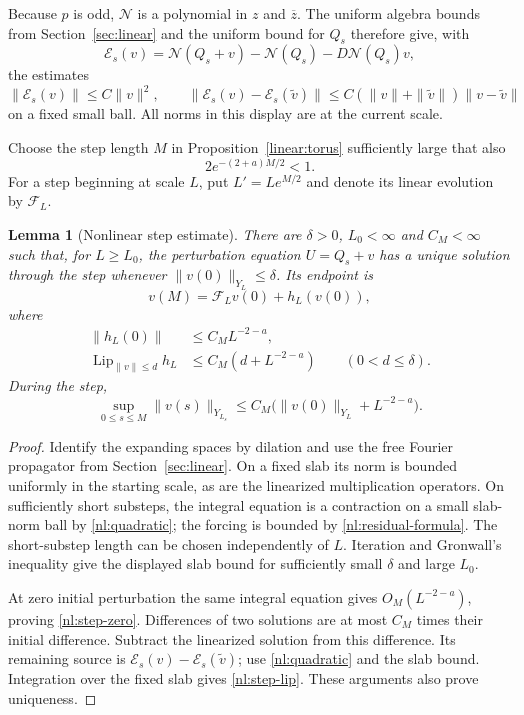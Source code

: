 \documentclass[11pt]{article}
\numberwithin{equation}{section}
\newtheorem{lemma}[theorem]{Lemma}
\theoremstyle{definition}
\theoremstyle{remark}
\begin{document}
Because $p$ is odd, $\mathcal N$ is a polynomial in $z$ and $\overline z$.
The uniform algebra bounds from Section~\ref{sec:linear} and the uniform
bound for $Q_s$ therefore give, with
\[
 \mathcal E_s(v)=\mathcal N(Q_s+v)-\mathcal N(Q_s)
                    -D\mathcal N(Q_s)v,
\]
the estimates
\begin{equation}\label{nl:quadratic}
 \|\mathcal E_s(v)\|\leq C\|v\|^2,
 \qquad
 \|\mathcal E_s(v)-\mathcal E_s(\widetilde v)\|
 \leq C(\|v\|+\|\widetilde v\|)\|v-\widetilde v\|
\end{equation}
on a fixed small ball. All norms in this display are at the current scale.

Choose the step length $M$ in Proposition~\ref{linear:torus} sufficiently
large that also
\begin{equation}\label{nl:step-condition}
 2e^{-(2+a)M/2}<1.
\end{equation}
For a step beginning at scale $L$, put $L'=Le^{M/2}$ and denote its linear
evolution by $\mathcal F_L$.

\begin{lemma}[Nonlinear step estimate]\label{nl:step}
There are $\delta>0$, $L_0<\infty$ and $C_M<\infty$ such that, for
$L\geq L_0$, the perturbation equation $U=Q_s+v$ has a unique solution
through the step whenever $\|v(0)\|_{Y_L}\leq\delta$. Its endpoint is
\[
 v(M)=\mathcal F_Lv(0)+h_L(v(0)),
\]
where
\begin{align}
 \|h_L(0)\|&\leq C_M L^{-2-a},\label{nl:step-zero}\\
 \operatorname{Lip}_{\|v\|\leq d}h_L
   &\leq C_M(d+L^{-2-a})\qquad(0<d\leq\delta).
 \label{nl:step-lip}
\end{align}
During the step,
\[
 \sup_{0\leq s\leq M}\|v(s)\|_{Y_{L_s}}
 \leq C_M\bigl(\|v(0)\|_{Y_L}+L^{-2-a}\bigr).
\]
\end{lemma}

\begin{proof}
Identify the expanding spaces by dilation and use the free Fourier
propagator from Section~\ref{sec:linear}. On a fixed slab its norm is
bounded uniformly in the starting scale, as are the linearized
multiplication operators. On sufficiently short substeps, the integral
equation is a contraction on a small slab-norm ball by
\eqref{nl:quadratic}; the forcing is bounded by
\eqref{nl:residual-formula}. The short-substep length can be chosen
independently of $L$. Iteration and Gronwall's inequality give the displayed
slab bound for sufficiently small $\delta$ and large $L_0$.

At zero initial perturbation the same integral equation gives
$O_M(L^{-2-a})$, proving \eqref{nl:step-zero}. Differences of two
solutions are at most $C_M$ times their initial difference. Subtract the
linearized solution from this difference. Its remaining source is
$\mathcal E_s(v)-\mathcal E_s(\widetilde v)$; use
\eqref{nl:quadratic} and the slab bound. Integration over the fixed slab
gives \eqref{nl:step-lip}. These arguments also prove uniqueness.
\end{proof}
\end{document}

